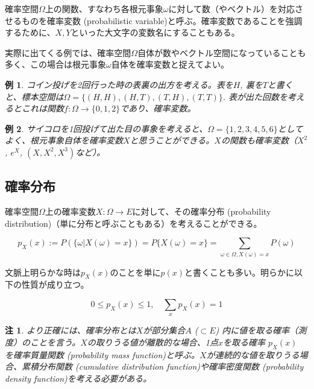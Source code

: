 \documentclass[uplatex,dvipdfmx]{jlreq}
\newcommand\term[1]{\textsf{#1}}
\newtheorem{example}{例}
\newtheorem{note}{注}
\begin{document}
確率空間$\Omega$上の関数、すなわち各根元事象$\omega$に対して数（やベクトル）を対応させるものを\term{確率変数 (probabilistic variable)}と呼ぶ。確率変数であることを強調するために、$X, Y$といった大文字の変数名にすることもある。

実際に出てくる例では、確率空間$\Omega$自体が数やベクトル空間になっていることも多く、この場合は根元事象$\omega$自体を確率変数と捉えてよい。

\begin{example}
    コイン投げを2回行った時の表裏の出方を考える。表を$H$, 裏を$T$と書くと、標本空間は$\Omega=\{(H, H), (H, T), (T, H), (T, T)\}$. 表が出た回数を考えるとこれは関数$f\colon \Omega \to \{0, 1, 2\}$であり、確率変数。
\end{example}

\begin{example}
    サイコロを1回投げて出た目の事象を考えると、$\Omega=\{1, 2, 3, 4, 5, 6\}$としてよく、根元事象自体を確率変数$X$と思うことができる。$X$の関数も確率変数（$X^2$, $e^X$, $(X, X^2, X^3)$など）。
\end{example}

\subsection{確率分布}

確率空間$\Omega$上の確率変数$X\colon \Omega \to E$に対して、その\term{確率分布 (probability distribution)}（単に分布と呼ぶこともある）を考えることができる。

\begin{equation}
    p_X(x) := P(\{\omega | X(\omega) = x\})
    = P\{X(\omega) = x\}
    = \sum_{\omega \in \Omega, X(\omega) = x} P(\omega)
\end{equation}

文脈上明らかな時は$p_X(x)$のことを単に$p(x)$と書くことも多い。明らかに以下の性質が成り立つ。

\begin{equation}
    0 \leq p_X(x) \leq 1, \quad \sum_x p_X(x) = 1
\end{equation}

\begin{note}
    より正確には、確率分布とは$X$が部分集合$A$ ($\subset E$) 内に値を取る確率（測度）のことを言う。$X$の取りうる値が離散的な場合、1点$x$を取る確率 $p_X(x)$ を\term{確率質量関数 (probability mass function)}と呼ぶ。$X$が連続的な値を取りうる場合、\term{累積分布関数 (cumulative distribution function)}や\term{確率密度関数 (probability density function)}を考える必要がある。
\end{note}
\end{document}
